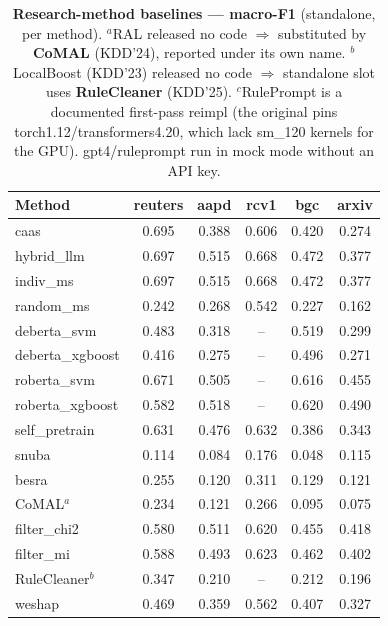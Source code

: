 \documentclass[11pt]{article}
\begin{document}
\begin{table}[h]\centering\footnotesize\setlength{\tabcolsep}{4pt}
\caption{\textbf{Research-method baselines --- macro-F1} (standalone, per method).
$^{a}$RAL released no code $\Rightarrow$ substituted by \textbf{CoMAL} (KDD'24), reported
under its own name. $^{b}$LocalBoost (KDD'23) released no code $\Rightarrow$ standalone slot
uses \textbf{RuleCleaner} (KDD'25). $^{c}$RulePrompt is a documented first-pass reimpl
(the original pins torch1.12/transformers4.20, which lack sm\_120 kernels for the GPU).
gpt4/ruleprompt run in mock mode without an API key.}
\label{tab:baselines}
\begin{tabular}{lccccc}
\toprule
Method & \textbf{reuters} & \textbf{aapd} & \textbf{rcv1} & \textbf{bgc} & \textbf{arxiv} \\
\midrule
\quad caas & 0.695 & 0.388 & 0.606 & 0.420 & 0.274 \\
\quad hybrid\_llm & 0.697 & 0.515 & 0.668 & 0.472 & 0.377 \\
\quad indiv\_ms & 0.697 & 0.515 & 0.668 & 0.472 & 0.377 \\
\quad random\_ms & 0.242 & 0.268 & 0.542 & 0.227 & 0.162 \\
\quad deberta\_svm & 0.483 & 0.318 & -- & 0.519 & 0.299 \\
\quad deberta\_xgboost & 0.416 & 0.275 & -- & 0.496 & 0.271 \\
\quad roberta\_svm & 0.671 & 0.505 & -- & 0.616 & 0.455 \\
\quad roberta\_xgboost & 0.582 & 0.518 & -- & 0.620 & 0.490 \\
\quad self\_pretrain & 0.631 & 0.476 & 0.632 & 0.386 & 0.343 \\
\quad snuba & 0.114 & 0.084 & 0.176 & 0.048 & 0.115 \\
\quad besra & 0.255 & 0.120 & 0.311 & 0.129 & 0.121 \\
\quad CoMAL$^{a}$ & 0.234 & 0.121 & 0.266 & 0.095 & 0.075 \\
\quad filter\_chi2 & 0.580 & 0.511 & 0.620 & 0.455 & 0.418 \\
\quad filter\_mi & 0.588 & 0.493 & 0.623 & 0.462 & 0.402 \\
\quad RuleCleaner$^{b}$ & 0.347 & 0.210 & -- & 0.212 & 0.196 \\
\quad weshap & 0.469 & 0.359 & 0.562 & 0.407 & 0.327 \\
\bottomrule
\end{tabular}
\end{table}
\end{document}
